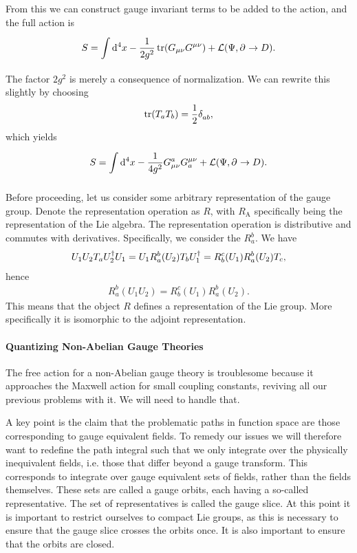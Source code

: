 From this we can construct gauge invariant terms to be added to the action, and the full action is
\begin{align*}
	S = \int\limits_{}^{}\dd[4]{x}-\frac{1}{2g^{2}}\tr(G_{\mu\nu}G^{\mu\nu}) + \mathcal{L}(\Psi, \partial^{}_{}\to D).
\end{align*}
The factor $2g^{2}$ is merely a consequence of normalization. We can rewrite this slightly by choosing
\begin{align*}
	\tr(T_{a}T_{b}) = \frac{1}{2}\kdelta{}{ab},
\end{align*}
which yields
\begin{align*}
	S = \int\limits_{}^{}\dd[4]{x}-\frac{1}{4g^{2}}G_{\mu\nu}^{a}G^{\mu\nu}_{a} + \mathcal{L}(\Psi, \partial^{}_{}\to D).
\end{align*}

Before proceeding, let us consider some arbitrary representation of the gauge group. Denote the representation operation as $R$, with $R_{\text{A}}$ specifically being the representation of the Lie algebra. The representation operation is distributive and commutes with derivatives. Specifically, we consider the $R_{a}^{b}$. We have
\begin{align*}
	U_{1}U_{2}T_{a}U_{2}^{\dagger} U_{1} = U_{1}R_{a}^{b}(U_{2})T_{b}U_{1}^{\dagger} = R_{b}^{c}(U_{1})R_{a}^{b}(U_{2})T_{c},
\end{align*}
hence
\begin{align*}
	R_{a}^{b}(U_{1}U_{2}) = R_{b}^{c}(U_{1})R_{a}^{b}(U_{2}).
\end{align*}
This means that the object $R$ defines a representation of the Lie group. More specifically it is isomorphic to the adjoint representation.

\paragraph{Quantizing Non-Abelian Gauge Theories}
The free action for a non-Abelian gauge theory is troublesome because it approaches the Maxwell action for small coupling constants, reviving all our previous problems with it. We will need to handle that.

A key point is the claim that the problematic paths in function space are those corresponding to gauge equivalent fields. To remedy our issues we will therefore want to redefine the path integral such that we only integrate over the physically inequivalent fields, i.e. those that differ beyond a gauge transform. This corresponds to integrate over gauge equivalent sets of fields, rather than the fields themselves. These sets are called a gauge orbits, each having a so-called representative. The set of representatives is called the gauge slice. At this point it is important to restrict ourselves to compact Lie groups, as this is necessary to ensure that the gauge slice crosses the orbits once. It is also important to ensure that the orbits are closed.

